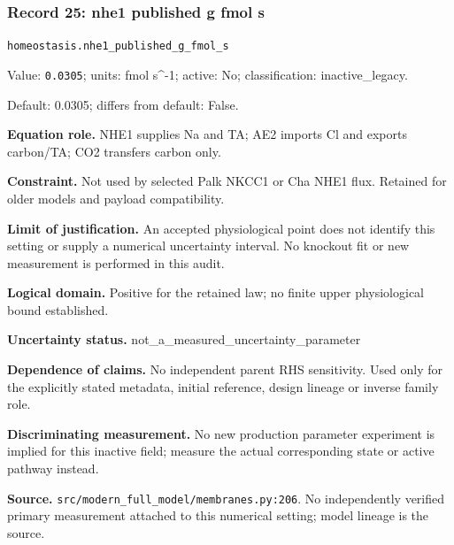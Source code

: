 \subsubsection*{Record 25: nhe1 published g fmol s}
{\small \nolinkurl{homeostasis.nhe1_published_g_fmol_s}\par

Value: \texttt{0.0305}; units: fmol s\textasciicircum{}-1; active: No; classification: inactive\_legacy.\par

Default: 0.0305; differs from default: False.\par

\textbf{Equation role.} NHE1 supplies Na and TA; AE2 imports Cl and exports carbon/TA; CO2 transfers carbon only.\par

\textbf{Constraint.} Not used by selected Palk NKCC1 or Cha NHE1 flux. Retained for older models and payload compatibility.\par

\textbf{Limit of justification.} An accepted physiological point does not identify this setting or supply a numerical uncertainty interval. No knockout fit or new measurement is performed in this audit.\par

\textbf{Logical domain.} Positive for the retained law; no finite upper physiological bound established.\par

\textbf{Uncertainty status.} not\_a\_measured\_uncertainty\_parameter\par

\textbf{Dependence of claims.} No independent parent RHS sensitivity. Used only for the explicitly stated metadata, initial reference, design lineage or inverse family role.\par

\textbf{Discriminating measurement.} No new production parameter experiment is implied for this inactive field; measure the actual corresponding state or active pathway instead.\par

\textbf{Source.} \nolinkurl{src/modern_full_model/membranes.py:206}. No independently verified primary measurement attached to this numerical setting; model lineage is the source.\par}

